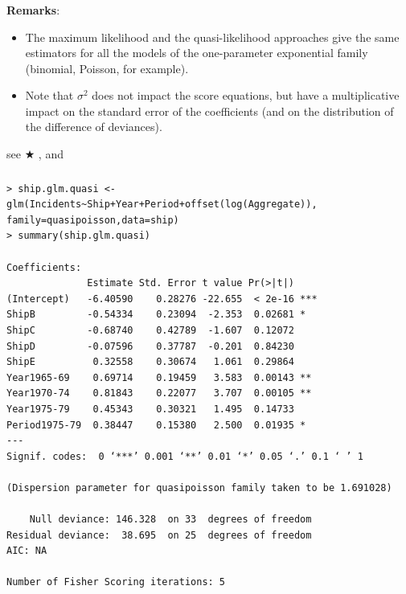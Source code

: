 \documentclass{beamer}
\newcommand{\bs}{\bigskip}
\begin{document}
\begin{frame}
\frametitle{}
\textbf{Remarks}:
\begin{itemize}
\item The maximum likelihood and the quasi-likelihood approaches give the same
estimators for all the models of the one-para\-meter exponential family (binomial,
Poisson, for example).
\item Note that $\sigma^2$ does not impact the score equations, but
  have a multiplicative impact on the standard error of the coefficients (and on
  the 
  distribution of the difference of deviances).
\end{itemize}

\bs
{see \color{red} $\bigstar$ ,  and }
\end{frame}

\begin{frame}[fragile]
\frametitle{}
\label{shipmodel.page}

{\scriptsize
\begin{verbatim}
> ship.glm.quasi <- glm(Incidents~Ship+Year+Period+offset(log(Aggregate)),
family=quasipoisson,data=ship)
> summary(ship.glm.quasi)

Coefficients:
              Estimate Std. Error t value Pr(>|t|)    
(Intercept)   -6.40590    0.28276 -22.655  < 2e-16 ***
ShipB         -0.54334    0.23094  -2.353  0.02681 *  
ShipC         -0.68740    0.42789  -1.607  0.12072    
ShipD         -0.07596    0.37787  -0.201  0.84230    
ShipE          0.32558    0.30674   1.061  0.29864    
Year1965-69    0.69714    0.19459   3.583  0.00143 ** 
Year1970-74    0.81843    0.22077   3.707  0.00105 ** 
Year1975-79    0.45343    0.30321   1.495  0.14733    
Period1975-79  0.38447    0.15380   2.500  0.01935 *  
---
Signif. codes:  0 ‘***’ 0.001 ‘**’ 0.01 ‘*’ 0.05 ‘.’ 0.1 ‘ ’ 1

(Dispersion parameter for quasipoisson family taken to be 1.691028)

    Null deviance: 146.328  on 33  degrees of freedom
Residual deviance:  38.695  on 25  degrees of freedom
AIC: NA

Number of Fisher Scoring iterations: 5
\end{verbatim}
}
\end{frame}
\end{document}
